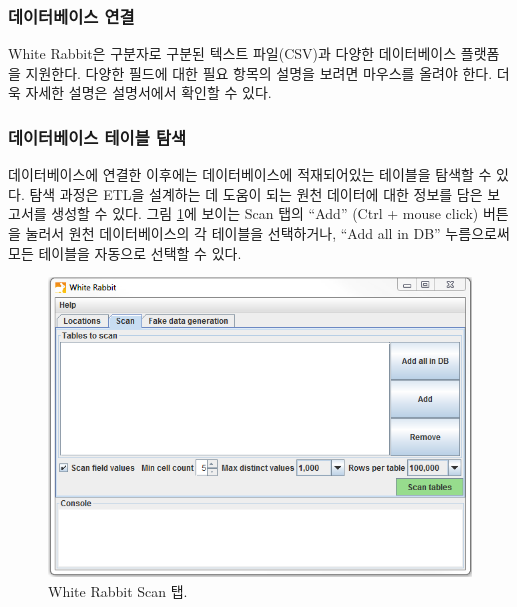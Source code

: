 \documentclass[10.5pt]{book}
\theoremstyle{definition}
\theoremstyle{definition}
\theoremstyle{definition}
\theoremstyle{remark}
\begin{document}
\subsubsection*{데이터베이스 연결}\label{-}

White Rabbit은 구분자로 구분된 텍스트 파일(CSV)과 다양한 데이터베이스
플랫폼을 지원한다. 다양한 필드에 대한 필요 항목의 설명을 보려면 마우스를
올려야 한다. 더욱 자세한 설명은 설명서에서 확인할 수 있다.

\subsubsection*{데이터베이스 테이블 탐색}\label{--}

데이터베이스에 연결한 이후에는 데이터베이스에 적재되어있는 테이블을
탐색할 수 있다. 탐색 과정은 ETL을 설계하는 데 도움이 되는 원천 데이터에
대한 정보를 담은 보고서를 생성할 수 있다. 그림
\ref{fig:WhiteRabbitAddTables}에 보이는 Scan 탭의 ``Add'' (Ctrl + mouse
click) 버튼을 눌러서 원천 데이터베이스의 각 테이블을 선택하거나, ``Add
all in DB'' 누름으로써 모든 테이블을 자동으로 선택할 수 있다.

\begin{figure}

{\centering \includegraphics[width=1\linewidth]{images/ExtractTransformLoad/WhiteRabbitAddTables} 

}

\caption{White Rabbit Scan 탭.}\label{fig:WhiteRabbitAddTables}
\end{figure}
\end{document}
